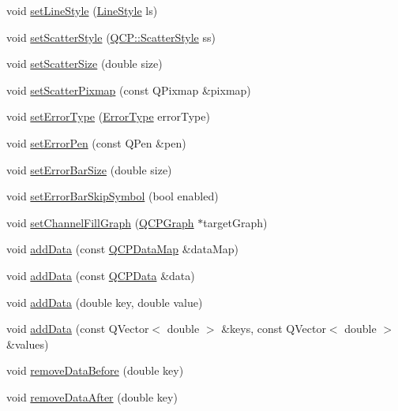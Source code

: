 \begin{DoxyCompactItemize}
\item 
void \hyperlink{classQCPGraph_a513fecccff5b2a50ce53f665338c60ff}{set\-Line\-Style} (\hyperlink{classQCPGraph_ad60175cd9b5cac937c5ee685c32c0859}{Line\-Style} ls)
\item 
void \hyperlink{classQCPGraph_a06373e09547bcfe237dd8ebcbe5c255a}{set\-Scatter\-Style} (\hyperlink{namespaceQCP_af66d0711d42fe78d96c28abadc67f26f}{Q\-C\-P\-::\-Scatter\-Style} ss)
\item 
void \hyperlink{classQCPGraph_a70d5c6058096797a227e6827ff743d89}{set\-Scatter\-Size} (double size)
\item 
void \hyperlink{classQCPGraph_a80131c36eb134fbfb603951ef70e0a19}{set\-Scatter\-Pixmap} (const Q\-Pixmap \&pixmap)
\item 
void \hyperlink{classQCPGraph_ac3614d799c3894f2bc646e99c7f73d38}{set\-Error\-Type} (\hyperlink{classQCPGraph_ad23b514404bd2cb3216f57c90904d6af}{Error\-Type} error\-Type)
\item 
void \hyperlink{classQCPGraph_abd4c7f81939e10776ea64603a704f22a}{set\-Error\-Pen} (const Q\-Pen \&pen)
\item 
void \hyperlink{classQCPGraph_a10f50c5495ce45ef559ec2066194a335}{set\-Error\-Bar\-Size} (double size)
\item 
void \hyperlink{classQCPGraph_ab1c1ee03d8dd94676a564e5e5f11aac2}{set\-Error\-Bar\-Skip\-Symbol} (bool enabled)
\item 
void \hyperlink{classQCPGraph_a2d03156df1b64037a2e36cfa50351ca3}{set\-Channel\-Fill\-Graph} (\hyperlink{classQCPGraph}{Q\-C\-P\-Graph} $\ast$target\-Graph)
\item 
void \hyperlink{classQCPGraph_aa5c6181d84db72ce4dbe9dc15a34ef4f}{add\-Data} (const \hyperlink{qcustomplot_8h_a84a9c4a4c2216ccfdcb5f3067cda76e3}{Q\-C\-P\-Data\-Map} \&data\-Map)
\item 
void \hyperlink{classQCPGraph_a80cc91e1e0ef77eb50afc5b366d0efd9}{add\-Data} (const \hyperlink{classQCPData}{Q\-C\-P\-Data} \&data)
\item 
void \hyperlink{classQCPGraph_a0bf98b1972286cfb7b1c4b7dd6ae2012}{add\-Data} (double key, double value)
\item 
void \hyperlink{classQCPGraph_ab6da6377541fe80d892a9893a92db9c6}{add\-Data} (const Q\-Vector$<$ double $>$ \&keys, const Q\-Vector$<$ double $>$ \&values)
\item 
void \hyperlink{classQCPGraph_a9fe0b3e54e8c7b61319bd03337e21e99}{remove\-Data\-Before} (double key)
\item 
void \hyperlink{classQCPGraph_ae42d645ef617cfc75fc0df58e62c522a}{remove\-Data\-After} (double key)

\end{DoxyCompactItemize}
